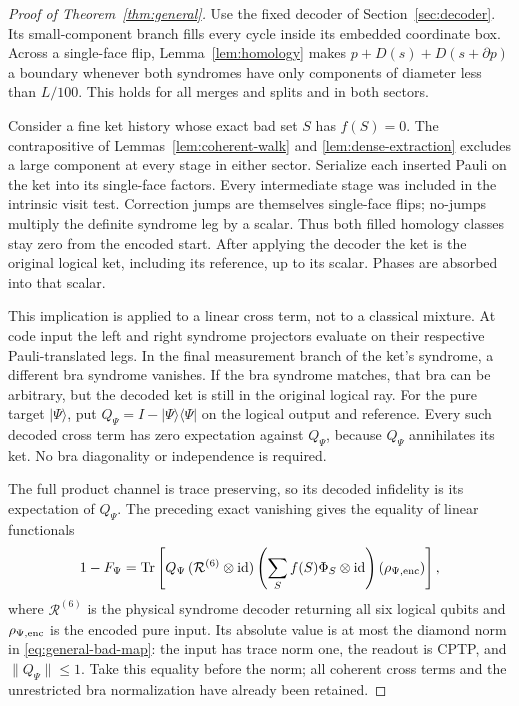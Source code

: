 \begin{proof}[Proof of Theorem~\ref{thm:general}]
Use the fixed decoder of Section~\ref{sec:decoder}.
Its small-component branch fills every cycle inside its
embedded coordinate box. Across a single-face flip,
Lemma~\ref{lem:homology} makes
\(p+D(s)+D(s+\partial p)\) a boundary whenever both
syndromes have only components of diameter less than \(L/100\).
This holds for all merges and splits and in both sectors.

Consider a fine ket history whose exact bad set \(S\)
has \(f(S)=0\).
The contrapositive of Lemmas~\ref{lem:coherent-walk}
and \ref{lem:dense-extraction} excludes a large
component at every stage in either sector.
Serialize each inserted Pauli on the ket into its
single-face factors. Every intermediate stage was
included in the intrinsic visit test.
Correction jumps are themselves single-face flips;
no-jumps multiply the definite syndrome leg by a scalar.
Thus both filled homology classes stay zero from
the encoded start. After applying the decoder the
ket is the original logical ket, including its
reference, up to its scalar. Phases are absorbed
into that scalar.

This implication is applied to a linear cross term,
not to a classical mixture. At code input the
left and right syndrome projectors evaluate on
their respective Pauli-translated legs.
In the final measurement branch of the ket's
syndrome, a different bra syndrome vanishes.
If the bra syndrome matches, that bra can be
arbitrary, but the decoded ket is still in the
original logical ray.
For the pure target \(|\Psi\rangle\), put
\(Q_\Psi=I-|\Psi\rangle\langle\Psi|\) on the
logical output and reference.
Every such decoded cross term has zero expectation
against \(Q_\Psi\), because \(Q_\Psi\) annihilates
its ket. No bra diagonality or independence is
required.

The full product channel is trace preserving, so
its decoded infidelity is its expectation of
\(Q_\Psi\). The preceding exact vanishing gives
the equality of linear functionals
\[
 1-F_\Psi=
 \operatorname{Tr}\left[Q_\Psi\,
  (\mathcal R^{(6)}\otimes\operatorname{id})
  \left(\sum_S f(S)\Phi_S\otimes\operatorname{id}\right)
  (\rho_{\Psi,{\rm enc}})\right],
\]
where \(\mathcal R^{(6)}\) is the physical
syndrome decoder returning all six logical qubits
and \(\rho_{\Psi,{\rm enc}}\) is the encoded
pure input. Its absolute value is at most the
diamond norm in \eqref{eq:general-bad-map}:
the input has trace norm one, the readout is
CPTP, and \(\|Q_\Psi\|\le1\).
Take this equality before the norm; all coherent
cross terms and the unrestricted bra normalization
have already been retained.


\end{proof}
